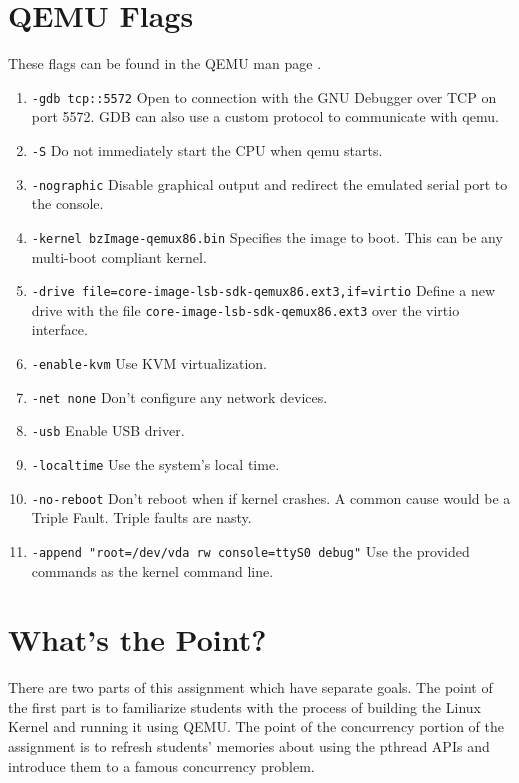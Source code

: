 \documentclass[10pt,conference,draftclsnofoot,onecolumn]{IEEEtran}
\begin{document}
\section{QEMU Flags}
These flags can be found in the QEMU man page \cite{qemu(1)}.
\begin{enumerate}
\item \texttt{-gdb tcp::5572} Open to connection with the GNU Debugger over TCP on port 5572. GDB can also use a custom protocol to communicate with qemu.
\item \texttt{-S} Do not immediately start the CPU when qemu starts.
\item \texttt{-nographic} Disable graphical output and redirect the emulated serial port to the console.
\item \texttt{-kernel bzImage-qemux86.bin} Specifies the image to boot. This can be any multi-boot compliant kernel.
\item \texttt{-drive file=core-image-lsb-sdk-qemux86.ext3,if=virtio} Define a new drive with the file \texttt{core-image-lsb-sdk-qemux86.ext3} over the virtio interface.
\item \texttt{-enable-kvm} Use KVM virtualization.
\item \texttt{-net none} Don't configure any network devices.
\item \texttt{-usb} Enable USB driver.
\item \texttt{-localtime} Use the system's local time.
\item \texttt{-no-reboot} Don't reboot when if kernel crashes. A common cause would be a Triple Fault. Triple faults are nasty.
\item \texttt{-append "root=/dev/vda rw console=ttyS0 debug"} Use the provided commands as the kernel command line.
\end{enumerate}

\section{What's the Point?}
There are two parts of this assignment which have separate goals. The point of the first part is to familiarize students with the process of building the Linux Kernel and running it using QEMU. The point of the concurrency portion of the assignment is to refresh students' memories about using the pthread APIs and introduce them to a famous concurrency problem.
\end{document}
